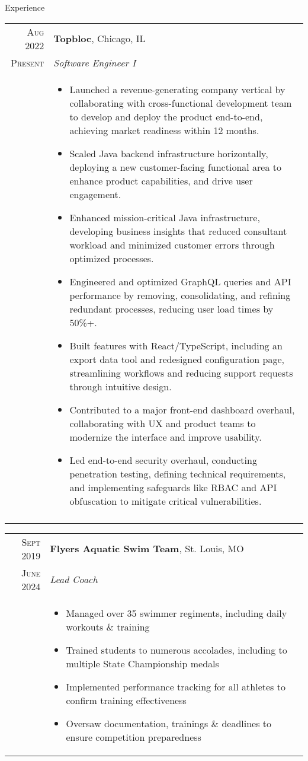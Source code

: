 \documentclass{resume}
\begin{document}
  \begin{rSection}{Experience}
\small
{
\begin{tabular}{r|p{15cm}}
        \textsc{Aug 2022} & \textbf{Topbloc}, Chicago, IL \\
        \textsc{Present}  & \textit{Software Engineer I} \\ &
        \begin{itemize}
         	\item {Launched a revenue-generating company vertical by collaborating with cross-functional development team to develop and deploy the product end-to-end, achieving market readiness within 12 months.}
			\item {Scaled Java backend infrastructure horizontally, deploying a new customer-facing functional area to enhance product capabilities, and drive user engagement.}
        	\item {Enhanced mission-critical Java infrastructure, developing business insights that reduced consultant workload and minimized customer errors through optimized processes.}
        	\item {Engineered and optimized GraphQL queries and API performance by removing, consolidating, and refining redundant processes, reducing user load times by 50\%+.}
        	\item {Built features with React/TypeScript, including an export data tool and redesigned configuration page, streamlining workflows and reducing support requests through intuitive design.}
        	\item {Contributed to a major front-end dashboard overhaul, collaborating with UX and product teams to modernize the interface and improve usability.}
        	\item {Led end-to-end security overhaul, conducting penetration testing, defining technical requirements, and implementing safeguards like RBAC and API obfuscation to mitigate critical vulnerabilities.}

        \end{itemize}\\ &
    \end{tabular}
    \begin{tabular}{r|p{15cm}}
        \textsc{Sept 2019} & \textbf{Flyers Aquatic Swim Team}, St. Louis, MO \\
        \textsc{June 2024}  & \textit{Lead Coach} \\ &
        \begin{itemize}
         	\item {Managed over 35 swimmer regiments, including daily workouts \& training}
        	\item {Trained students to numerous accolades, including to multiple State Championship medals}
	  		\item {Implemented performance tracking for all athletes to confirm training effectiveness}
           	\item {Oversaw documentation, trainings \& deadlines to ensure competition preparedness}
        \end{itemize}
    \end{tabular}
}
\end{rSection}
\end{document}
